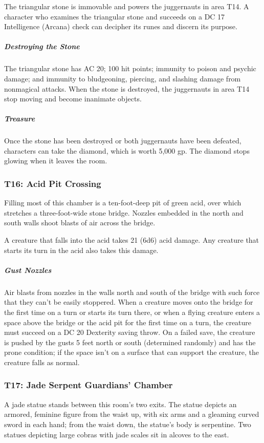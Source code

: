\documentclass[10pt,a4paper,twoside,bg=print,twocolumn,openany,nodeprecatedcode]{dndbook}
\begin{document}
The triangular stone is immovable and powers the juggernauts in area T14. A character who examines the triangular stone and succeeds on a DC 17 Intelligence (Arcana) check can decipher its runes and discern its purpose.

\subparagraph{Destroying the Stone}
The triangular stone has AC 20; 100 hit points; immunity to poison and psychic damage; and immunity to bludgeoning, piercing, and slashing damage from nonmagical attacks. When the stone is destroyed, the juggernauts in area T14 stop moving and become inanimate objects.

\subparagraph{Treasure}
Once the stone has been destroyed or both juggernauts have been defeated, characters can take the diamond, which is worth 5,000 gp. The diamond stops glowing when it leaves the room.

\subsubsection{T16: Acid Pit Crossing}
\begin{DndReadAloud}{}
Filling most of this chamber is a ten-foot-deep pit of green acid, over which stretches a three-foot-wide stone bridge. Nozzles embedded in the north and south walls shoot blasts of air across the bridge.

\end{DndReadAloud}

A creature that falls into the acid takes 21 (6d6) acid damage. Any creature that starts its turn in the acid also takes this damage.

\subparagraph{Gust Nozzles}
Air blasts from nozzles in the walls north and south of the bridge with such force that they can't be easily stoppered. When a creature moves onto the bridge for the first time on a turn or starts its turn there, or when a flying creature enters a space above the bridge or the acid pit for the first time on a turn, the creature must succeed on a DC 20 Dexterity saving throw. On a failed save, the creature is pushed by the gusts 5 feet north or south (determined randomly) and has the prone condition; if the space isn't on a surface that can support the creature, the creature falls as normal.

\subsubsection{T17: Jade Serpent Guardians' Chamber}
\begin{DndReadAloud}{}
A jade statue stands between this room's two exits. The statue depicts an armored, feminine figure from the waist up, with six arms and a gleaming curved sword in each hand; from the waist down, the statue's body is serpentine. Two statues depicting large cobras with jade scales sit in alcoves to the east.

\end{DndReadAloud}
\end{document}
